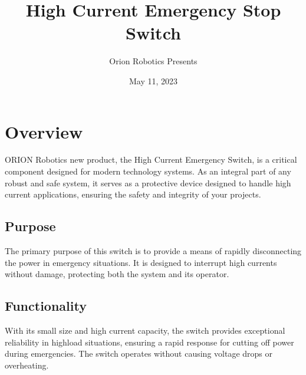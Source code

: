 \documentclass[letterpaper,10pt,english]{sphinxmanual}
\title{High Current Emergency Stop Switch}
\date{May 11, 2023}
\author{Orion Robotics Presents}
\begin{document}
\pagestyle{empty}
\sphinxmaketitle
\pagestyle{plain}
\sphinxtableofcontents
\pagestyle{normal}
\label{\detokenize{index::doc}}


\sphinxstepscope


\chapter{Overview}
\label{\detokenize{overview:overview}}\label{\detokenize{overview::doc}}
\sphinxAtStartPar
ORION Robotics new product, the High Current Emergency Switch, is a critical component designed for modern technology systems. As an integral part of any robust and safe system, it serves as a protective device designed to handle high current applications, ensuring the safety and integrity of your projects.


\section{Purpose}
\label{\detokenize{overview:purpose}}
\sphinxAtStartPar
The primary purpose of this switch is to provide a means of rapidly disconnecting the power in emergency situations. It is designed to interrupt high currents without damage, protecting both the system and its operator.


\section{Functionality}
\label{\detokenize{overview:functionality}}
\sphinxAtStartPar
With its small size and high current capacity, the switch provides exceptional reliability in high\sphinxhyphen{}load situations, ensuring a rapid response for cutting off power during emergencies. The switch operates without causing voltage drops or overheating.
\end{document}
